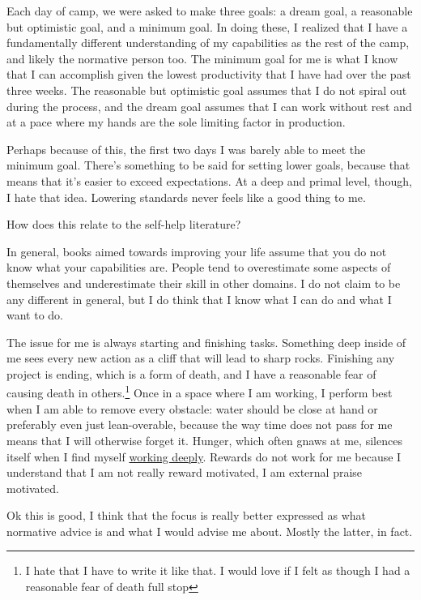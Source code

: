\documentclass[12pt]{article}
\renewcommand{\,}{\textsuperscript{,}}
\begin{document}
Each day of camp, we were asked to make three goals: a dream goal, a reasonable but optimistic goal, and a minimum goal.  
In doing these, I realized that I have a fundamentally different understanding of my capabilities as the rest of the camp, and likely the normative person too.  
The minimum goal for me is what I know that I can accomplish given the lowest productivity that I have had over the past three weeks.  
The reasonable but optimistic goal assumes that I do not spiral out during the process, and the dream goal assumes that I can work without rest and at a pace where my hands are the sole limiting factor in production.

Perhaps because of this, the first two days I was barely able to meet the minimum goal.  
There's something to be said for setting lower goals, because that means that it's easier to exceed expectations.  
At a deep and primal level, though, I hate that idea.  
Lowering standards never feels like a good thing to me.

How does this relate to the self-help literature?

In general, books aimed towards improving your life assume that you do not know what your capabilities are.  
People tend to overestimate some aspects of themselves and underestimate their skill in other domains.  
I do not claim to be any different in general, but I do think that I know what I can do and what I want to do.

The issue for me is always starting and finishing tasks.  
Something deep inside of me sees every new action as a cliff that will lead to sharp rocks.  
Finishing any project is ending, which is a form of death, and I have a reasonable fear of causing death in others.\footnote{I hate that I have to write it like that. I would love if I felt as though I had a reasonable fear of death full stop}  
Once in a space where I am working, I perform best when I am able to remove every obstacle: water should be close at hand or preferably even just lean-overable, because the way time does not pass for me means that I will otherwise forget it.  
Hunger, which often gnaws at me, silences itself when I find myself \href{fugues-and-flow}{working deeply}.  
Rewards do not work for me because I understand that I am not really reward motivated, I am external praise motivated.

Ok this is good, I think that the focus is really better expressed as what normative advice is and what I would advise me about.  
Mostly the latter, in fact.
\end{document}
